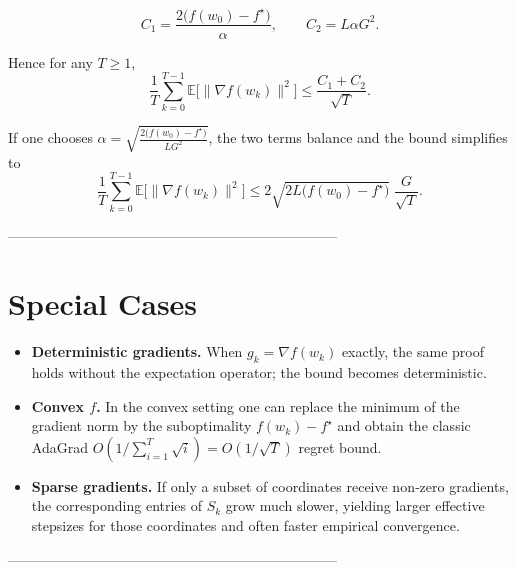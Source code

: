 \documentclass[11pt]{article}
\newcommand{\E}{\mathbb{E}}
\begin{document}
\[
C_{1}= \frac{2\bigl(f(w_{0})-f^{\star}\bigr)}{\alpha},
\qquad
C_{2}=L\alpha G^{2}.
\]

Hence for any $T\ge1$,
\[
\frac{1}{T}\sum_{k=0}^{T-1}\E\!\bigl[\|\nabla f(w_{k})\|^{2}\bigr]
\le \frac{C_{1}+C_{2}}{\sqrt{T}}.
\]

If one chooses $\alpha=\sqrt{\frac{2\bigl(f(w_{0})-f^{\star}\bigr)}{L G^{2}}}$,
the two terms balance and the bound simplifies to
\[
\frac{1}{T}\sum_{k=0}^{T-1}\E\!\bigl[\|\nabla f(w_{k})\|^{2}\bigr]
\le 2\sqrt{2L\bigl(f(w_{0})-f^{\star}\bigr)}\;\frac{G}{\sqrt{T}}.
\]

-----------------------------------------------------------------------

\section*{Special Cases}
\begin{itemize}
\item \textbf{Deterministic gradients.}
  When $g_{k}=\nabla f(w_{k})$ exactly, the same proof holds without the
  expectation operator; the bound becomes deterministic.
\item \textbf{Convex $f$.}
  In the convex setting one can replace the minimum of the gradient norm by
  the suboptimality $f(w_{k})-f^{\star}$ and obtain the classic AdaGrad
  $O(1/\sum_{i=1}^{T}\sqrt{i})=O(1/\sqrt{T})$ regret bound.
\item \textbf{Sparse gradients.}
  If only a subset of coordinates receive non‑zero gradients,
  the corresponding entries of $S_{k}$ grow much slower, yielding
  larger effective stepsizes for those coordinates and often faster
  empirical convergence.
\end{itemize}

-----------------------------------------------------------------------
\end{document}
